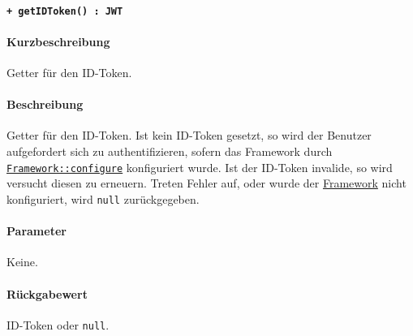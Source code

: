 \paragraph{\texttt{+ getIDToken() : JWT}}\label{AP_Framework_getIDToken}%
\paragraph*{Kurzbeschreibung}
Getter für den ID-Token.
\paragraph*{Beschreibung}
Getter für den ID-Token.
Ist kein ID-Token gesetzt, so wird der Benutzer aufgefordert sich zu authentifizieren, sofern das Framework durch \hyperref[AP_Framework_configure]{\texttt{Framework::configure}} konfiguriert wurde.
Ist der ID-Token invalide, so wird versucht diesen zu erneuern.
Treten Fehler auf, oder wurde der \hyperref[AP_Framework]{Framework} nicht konfiguriert, wird \verb#null# zurückgegeben.
\paragraph*{Parameter}
Keine.
\paragraph*{Rückgabewert}
ID-Token oder \verb#null#.
